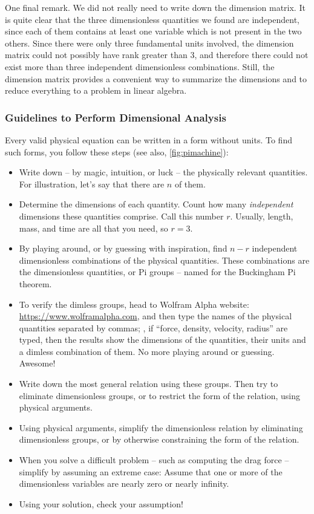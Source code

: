 One final remark. We did not really need to write down the dimension matrix. It is quite clear that the three dimensionless quantities we found are independent, since each of them contains at least one variable which is not present in the two others. Since there were only three fundamental units involved, the dimension matrix could not possibly have rank greater than 3, and therefore there could not exist more than three independent dimensionless combinations. Still, the dimension matrix provides a convenient way to summarize the dimensions and to reduce everything to a problem in linear algebra.


\subsubsection{Guidelines to Perform Dimensional Analysis}
Every valid physical equation can be written in a form without units. To find such forms, you follow these steps (see also, \cref{fig:pimachine}):
\begin{itemize}
\item Write down -- by magic, intuition, or luck -- the physically relevant quantities. For illustration, let's say that there are $n$ of them.
%
\item Determine the dimensions of each quantity. Count how many \emph{independent} dimensions these quantities comprise. Call this number $r$. Usually, length, mass, and time are all that you need, so $r = 3$.
%
\item By playing around, or by guessing with inspiration, find $n - r$ independent dimensionless combinations of the physical quantities. These combinations are the dimensionless quantities, or Pi groups -- named for the Buckingham Pi theorem.
%
\item To verify the dimless groups, head to Wolfram Alpha website: \url{https://www.wolframalpha.com}, and then type the names of the physical quantities separated by commas; \ie, if ``force, density, velocity, radius'' are typed, then the results show the dimensions of the quantities, their units and a dimless combination of them. No more playing around or guessing. Awesome!
%
\item Write down the most general relation using these groups. Then try to eliminate dimensionless groups, or to restrict the form of the relation, using physical arguments.
%
\item Using physical arguments, simplify the dimensionless relation by eliminating dimensionless groups, or by otherwise constraining the form of the relation.
%
\item When you solve a difficult problem -- such as computing the drag force -- simplify by assuming an extreme case: Assume that one or more of the dimensionless variables are nearly zero or nearly infinity.
%
\item Using your solution, check your assumption!
%
\end{itemize}
